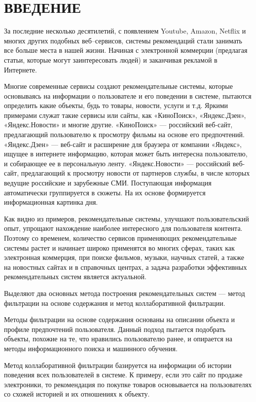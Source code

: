 \section*{ВВЕДЕНИЕ}

За последние несколько десятилетий, с появлением Youtube, Amazon, Netflix и многих других подобных веб–сервисов, системы рекомендаций стали занимать все больше места в нашей жизни. Начиная с электронной коммерции (предлагая статьи, которые могут заинтересовать людей) и заканчивая рекламой в Интернете.

Многие современные сервисы создают рекомендательные системы, которые основываясь на информации о пользователе и его поведении в системе, пытаются определить какие объекты, будь то товары, новости, услуги  и т.д. Яркими примерами служат такие сервисы или сайты, как «КиноПоиск», «Яндекс.Дзен», «Яндекс.Новости» и многие другие. «КиноПоиск» --- российский веб-сайт, предлагающий пользователю к просмотру фильмы на основе его предпочтений. «Яндекс.Дзен» --- веб-сайт и расширение для браузера от компании «Яндекс», ищущее в интернете информацию, которая может быть интересна пользователю, и собирающее ее в персональную ленту. «Яндекс.Новости» --- российский веб-сайт, предлагающий к просмотру новости от партнеров службы, в числе которых ведущие российские и зарубежные СМИ. Поступающая информация автоматически группируется в сюжеты. На их основе формируется информационная картинка дня.

Как видно из примеров, рекомендательные системы, улучшают пользовательский опыт, упрощают нахождение наиболее интересного для пользователя контента. Поэтому со временем, количество сервисов применяющих рекомендательные системы растет и начинает широко применятся во многих сферах, таких как электронная коммерция, при поиске фильмов, музыки, научных статей, а также на новостных сайтах и в справочных центрах, а задача разработки эффективных рекомендательных систем является актуальной.

Выделяют два основных метода построения рекомендательных систем --- метод фильтрации на основе содержания и метод коллаборативной фильтрации.

Методы фильтрации на основе содержания основаны на описании объекта и профиле предпочтений пользователя. Данный подход пытается подобрать объекты, похожие на те, что нравились пользователю ранее, и опирается на методы информационного поиска и машинного обучения.

Метод коллаборативной фильтрации базируется на информации об истории поведения всех пользователей в системе. К примеру, если это сайт по продаже электроники, то рекомендация по покупке товаров основывается на пользователях со схожей историей и их отношениях к объекту.

